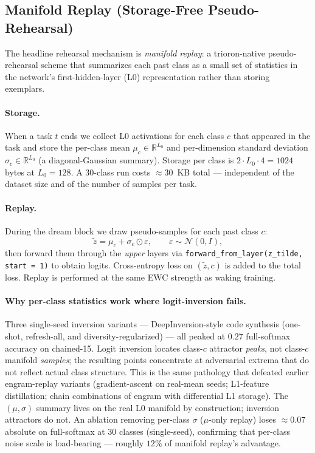\documentclass[11pt]{article}
\newcommand{\R}{\mathbb{R}}
\begin{document}
\subsection{Manifold Replay (Storage-Free Pseudo-Rehearsal)}
\label{sec:manifold-replay}

The headline rehearsal mechanism is \emph{manifold replay}: a
trioron-native pseudo-rehearsal scheme that summarizes each past class as
a small set of statistics in the network's first-hidden-layer (L0)
representation rather than storing exemplars.

\paragraph{Storage.}
When a task $t$ ends we collect L0 activations for each class $c$ that
appeared in the task and store the per-class mean
$\mu_c \in \R^{L_0}$ and per-dimension standard deviation
$\sigma_c \in \R^{L_0}$ (a diagonal-Gaussian summary). Storage per class is
$2 \cdot L_0 \cdot 4 = 1024$ bytes at $L_0 = 128$. A 30-class run costs
$\approx\!30$~KB total --- independent of the dataset size and of the
number of samples per task.

\paragraph{Replay.}
During the dream block we draw pseudo-samples for each past class $c$:
\begin{equation}
  \tilde z = \mu_c + \sigma_c \odot \varepsilon,
  \qquad \varepsilon \sim \mathcal{N}(0, I),
\end{equation}
then forward them through the \emph{upper} layers via
\texttt{forward\_from\_layer(z\_tilde, start = 1)} to obtain logits.
Cross-entropy loss on $(\tilde z, c)$ is added to the total loss. Replay
is performed at the same EWC strength as waking training.

\paragraph{Why per-class statistics work where logit-inversion fails.}
Three single-seed inversion variants --- DeepInversion-style code
synthesis (one-shot, refresh-all, and diversity-regularized) --- all
peaked at $0.27$ full-softmax accuracy on chained-15. Logit inversion
locates class-$c$ attractor \emph{peaks}, not class-$c$ manifold
\emph{samples}; the resulting points concentrate at adversarial extrema
that do not reflect actual class structure. This is the same pathology
that defeated earlier engram-replay variants (gradient-ascent on real-mean
seeds; L1-feature distillation; chain combinations of engram with
differential L1 storage). The $(\mu, \sigma)$ summary lives on the real L0
manifold by construction; inversion attractors do not. An ablation
removing per-class $\sigma$ ($\mu$-only replay) loses $\approx\!0.07$
absolute on full-softmax at 30 classes (single-seed), confirming that
per-class noise scale is load-bearing --- roughly $12\%$ of manifold
replay's advantage.
\end{document}
